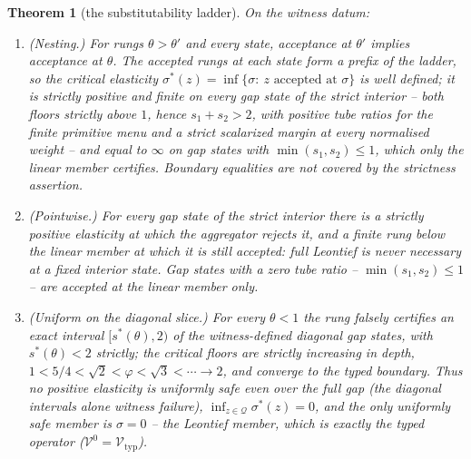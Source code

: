 \documentclass[preprint,11pt,authoryear]{elsarticle}
\newtheorem{theorem}{Theorem}
\theoremstyle{definition}
\theoremstyle{remark}
\newcommand{\Vtyp}{\mathcal{V}_{\mathrm{typ}}}
\newcommand{\Q}{\mathcal{Q}}
\begin{document}
\begin{theorem}[the substitutability ladder]\label{thm:ladder}
On the witness datum:
\begin{enumerate}[label=\textup{(\roman*)},leftmargin=2em]
\item \textup{(Nesting.)} For rungs $\theta>\theta'$ and every state, acceptance at $\theta'$ implies acceptance at $\theta$. The accepted rungs at each state form a prefix of the ladder, so the \emph{critical elasticity} $\sigma^*(z)=\inf\{\sigma:\ z\text{ accepted at }\sigma\}$ is well defined; it is strictly positive and finite on every gap state of the strict interior -- both floors strictly above $1$, hence $s_1+s_2>2$, with positive tube ratios for the finite primitive menu and a strict scalarized margin at every normalised weight -- and equal to $\infty$ on gap states with $\min(s_1,s_2)\le1$, which only the linear member certifies. Boundary equalities are not covered by the strictness assertion.
\item \textup{(Pointwise.)} For every gap state of the strict interior there is a strictly positive elasticity at which the aggregator rejects it, and a finite rung below the linear member at which it is still accepted: full Leontief is never necessary at a fixed interior state. Gap states with a zero tube ratio -- $\min(s_1,s_2)\le1$ -- are accepted at the linear member only.
\item \textup{(Uniform on the diagonal slice.)} For every $\theta<1$ the rung falsely certifies an exact interval $[s^*(\theta),2)$ of the witness-defined diagonal gap states, with $s^*(\theta)<2$ strictly; the critical floors are strictly increasing in depth, $1<5/4<\sqrt2<\varphi<\sqrt3<\cdots\to2$, and converge to the typed boundary. Thus no positive elasticity is uniformly safe even over the full gap (the diagonal intervals alone witness failure), $\inf_{z\in\Q}\sigma^*(z)=0$, and the only uniformly safe member is $\sigma=0$ -- the Leontief member, which is exactly the typed operator ($\mathcal V^{0}=\Vtyp$).
\end{enumerate}
\end{theorem}
\end{document}
